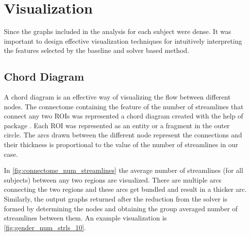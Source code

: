\documentclass[msthesis.tex]{subfiles}
\begin{document}
\section{Visualization}
Since the graphs included in the analysis for each subject were dense. It was important to design effective visualization techniques for intuitively interpreting the features selected by the baseline and solver based method. 

\subsection{Chord Diagram}
A chord diagram is an effective way of visualizing the flow between different nodes. The connectome containing the feature of the number of streamlines that connect any two ROIs was represented a chord diagram created with the help of package \cite{stevens2015holoviews}. Each ROI was represented as an entity or a fragment in the outer circle. The arcs drawn between the different node represent the connections and their thickness is proportional to the value of the number of streamlines in our case. 

In \autoref{fig:connectome_num_streamlines} the average number of streamlines (for all subjects) between any two regions are visualized. There are multiple arcs connecting the two regions and these arcs get bundled and result in a thicker arc. Similarly, the output graphs returned after the reduction from the solver is formed by determining the nodes and obtaining the group averaged number of streamlines between them. An example visualization is \autoref{fig:gender_num_strls_10}.
\end{document}
